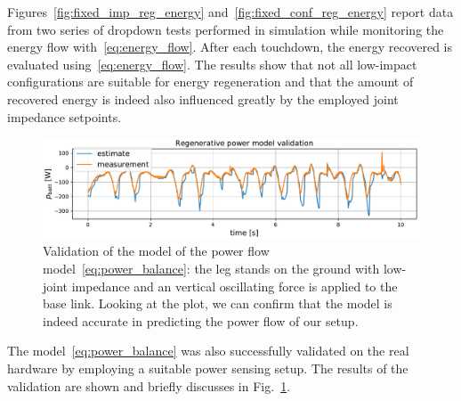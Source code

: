 Figures~\ref{fig:fixed_imp_reg_energy} and~\ref{fig:fixed_conf_reg_energy} report data from two series of dropdown tests performed in simulation while monitoring the energy flow with~\eqref{eq:energy_flow}. 
After each touchdown, the energy recovered is evaluated using~\eqref{eq:energy_flow}. The results show that not all low-impact configurations are suitable for energy regeneration and that the amount of recovered energy is indeed also influenced greatly by the employed joint impedance setpoints. 
\begin{figure}[t]
    \centering
    \includegraphics[width=1.0\columnwidth]{images/reg_pow_tracking.pdf}
    \caption{Validation of the model of the power flow model~\eqref{eq:power_balance}: the leg stands on the ground with low-joint impedance and an vertical oscillating force is applied to the base link. Looking at the plot, we can confirm that the model is indeed accurate in predicting the power flow of our setup.}
    \label{fig:reg_pow_model_tracking}
\end{figure}
The model~\eqref{eq:power_balance} was also successfully validated on the real hardware by employing a suitable power sensing setup. The results of the validation are shown and briefly discusses in Fig.~\ref{fig:reg_pow_model_tracking}. 
